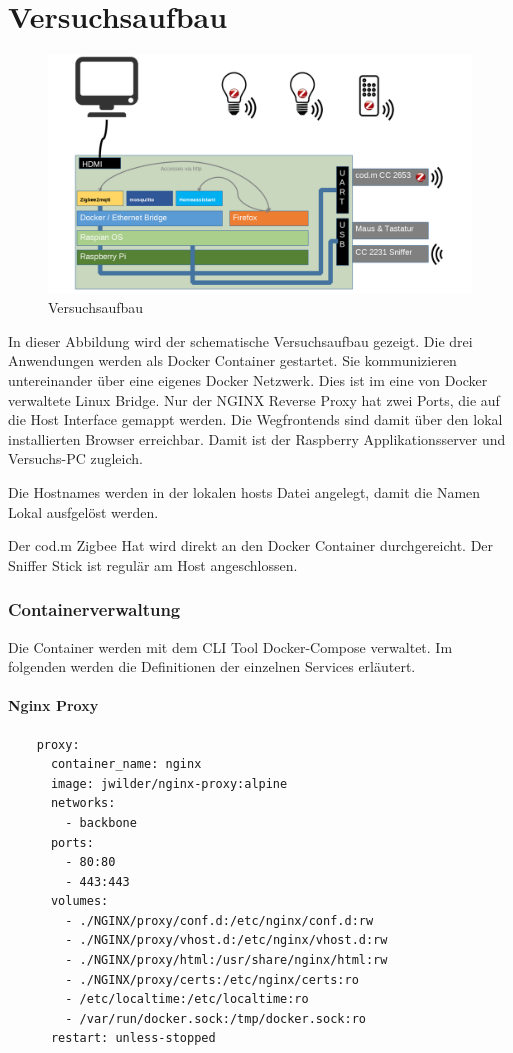 \chapter{Versuchsaufbau}

\begin{figure}[H]
    \centering
    \includegraphics[width=1\textwidth]{media/Versuchsaufbau/image1.png}
    \caption{Versuchsaufbau}
  \end{figure}

In dieser Abbildung wird der schematische Versuchsaufbau gezeigt. Die drei Anwendungen werden als Docker Container gestartet. Sie kommunizieren
untereinander über eine eigenes Docker Netzwerk. Dies ist im eine von Docker verwaltete Linux Bridge. Nur der NGINX Reverse Proxy hat zwei Ports, die
auf die Host Interface gemappt werden. Die Wegfrontends sind damit über den lokal installierten Browser erreichbar. Damit ist der Raspberry Applikationsserver
und Versuchs-PC zugleich.

Die Hostnames werden in der lokalen hosts Datei angelegt, damit die Namen Lokal ausfgelöst werden.

Der cod.m Zigbee Hat wird direkt an den Docker Container durchgereicht. Der Sniffer Stick ist regulär am Host angeschlossen. 

\subsection{Containerverwaltung}

Die Container werden mit dem CLI Tool \grqq Docker-Compose \grqq{} verwaltet. Im folgenden werden die Definitionen der einzelnen Services erläutert.

\subsubsection{Nginx Proxy}
\begin{lstlisting}
    proxy:
      container_name: nginx
      image: jwilder/nginx-proxy:alpine
      networks:
        - backbone
      ports:
        - 80:80
        - 443:443
      volumes:
        - ./NGINX/proxy/conf.d:/etc/nginx/conf.d:rw
        - ./NGINX/proxy/vhost.d:/etc/nginx/vhost.d:rw
        - ./NGINX/proxy/html:/usr/share/nginx/html:rw
        - ./NGINX/proxy/certs:/etc/nginx/certs:ro
        - /etc/localtime:/etc/localtime:ro
        - /var/run/docker.sock:/tmp/docker.sock:ro
      restart: unless-stopped
\end{lstlisting}

